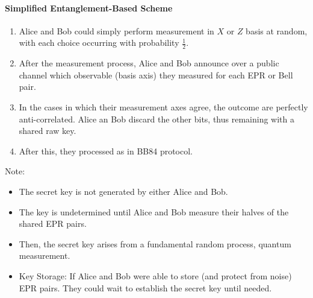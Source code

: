 \documentclass[]{book}
\theoremstyle{nonumberplain}
\begin{document}
\paragraph{Simplified Entanglement-Based Scheme}
\begin{enumerate}
    \item Alice and Bob could simply perform measurement in $X$ or $Z$ basis at random, with each choice occurring with probability $\frac{1}{2}$.
    \item After the measurement process, Alice and Bob announce over a public channel which observable (basis axis) they measured for each EPR or Bell pair.
    \item In the cases in which their measurement axes agree, the outcome are perfectly anti-correlated. Alice an Bob discard the other bits, thus remaining with a shared raw key.
    \item After this, they processed as in BB84 protocol.
\end{enumerate}

Note:
\begin{itemize}
    \item The secret key is not generated by either Alice and Bob.
    \item The key is undetermined until Alice and Bob measure their halves of the shared EPR pairs.
    \item Then, the secret key arises from a fundamental random process, quantum measurement.
    \item Key Storage: If Alice and Bob were able to store (and protect from noise) EPR pairs. They could wait to establish the secret key until needed.
\end{itemize}
\end{document}
